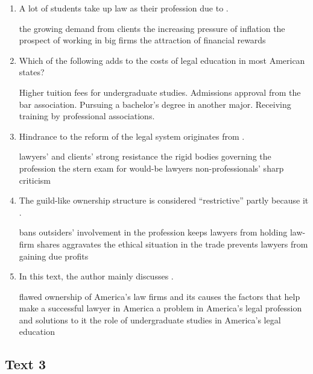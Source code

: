 \begin{enumerate}[resume]
	\item
 A lot of students take up law as their profession due to \lineread.


\fourchoices
{the growing demand from clients}
{the increasing pressure of inflation}
{the prospect of working in big firms}
{the attraction of financial rewards}



\item
Which of the following adds to the costs of legal education
in most American states?


\fourchoices
{Higher tuition fees for undergraduate studies.}
{Admissions approval from the bar association.}
{Pursuing a bachelor's degree in another major.}
{Receiving training by professional associations.}


\item
Hindrance to the reform of the legal system originates from \lineread.


\fourchoices
{lawyers' and clients' strong resistance}
{the rigid bodies governing the profession}
{the stern exam for would-be lawyers}
{non-professionals' sharp criticism}

\item
The guild-like ownership structure is considered
	``restrictive'' partly because it \lineread.


\fourchoices
{bans outsiders' involvement in the profession}
{keeps lawyers from holding law-firm shares}
{aggravates the ethical situation in the trade}
{prevents lawyers from gaining due profits}



\item
In this text, the author mainly discusses \lineread.


\fourchoices
{flawed ownership of America's law firms and its causes}
{the factors that help make a successful lawyer in America}
{a problem in America's legal profession and solutions to it}
{the role of undergraduate studies in America's legal education}

	
\end{enumerate}


\newpage
\subsection{Text 3}


